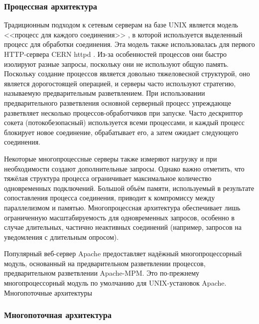 \subsubsection{Процессная архитектура}

Традиционным подходом к сетевым серверам на базе UNIX является модель <<процесс для каждого соединения>> \cite{unix-prog}, в которой используется выделенный процесс для обработки соединения. Эта модель также использовалась для первого HTTP-сервера CERN httpd \cite{w3daemon}. Из-за особенностей процессов они быстро изолируют разные запросы, поскольку они не используют общую память. Поскольку создание процессов является довольно тяжеловесной структурой, оно является дорогостоящей операцией, и серверы часто используют стратегию, называемую предварительным разветвлением. При использовании предварительного разветвления основной серверный процесс упреждающе разветвляет несколько процессов-обработчиков при запуске. Часто дескриптор сокета (потокобезопасный) используется всеми процессами, и каждый процесс блокирует новое соединение, обрабатывает его, а затем ожидает следующего соединения.

Некоторые многопроцессные серверы также измеряют нагрузку и при необходимости создают дополнительные запросы. Однако важно отметить, что тяжёлая структура процесса ограничивает максимальное количество одновременных подключений. Большой объём памяти, используемый в результате сопоставления процесса соединения, приводит к компромиссу между параллелизмом и памятью. Многопроцессная архитектура обеспечивает лишь ограниченную масштабируемость для одновременных запросов, особенно в случае длительных, частично неактивных соединений (например, запросов на уведомления с длительным опросом).

Популярный веб-сервер Apache предоставляет надёжный многопроцессорный модуль, основанный на предварительном разветвлении процессов, предварительном разветвлении Apache-MPM. Это по-прежнему многопроцессорный модуль по умолчанию для UNIX-установок Apache.
Многопоточные архитектуры

\subsubsection{Многопоточная архитектура}

